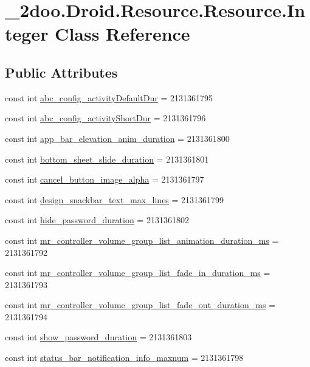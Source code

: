 \hypertarget{class__2doo_1_1_droid_1_1_resource_1_1_integer}{
\section{\_\-2doo.Droid.Resource.Resource.Integer Class Reference}
\label{class__2doo_1_1_droid_1_1_resource_1_1_integer}
}
\subsection*{Public Attributes}
\begin{CompactItemize}
\item 
const int \hyperlink{class__2doo_1_1_droid_1_1_resource_1_1_integer_058b4b1e30bfc11be0626549cce96bee}{abc\_\-config\_\-activityDefaultDur} = 2131361795
\item 
const int \hyperlink{class__2doo_1_1_droid_1_1_resource_1_1_integer_482e0f2d8ca0e8b5a579e2beb8ee8782}{abc\_\-config\_\-activityShortDur} = 2131361796
\item 
const int \hyperlink{class__2doo_1_1_droid_1_1_resource_1_1_integer_e4d7528bd04adaa7c39b17f892f35fa4}{app\_\-bar\_\-elevation\_\-anim\_\-duration} = 2131361800
\item 
const int \hyperlink{class__2doo_1_1_droid_1_1_resource_1_1_integer_c4a8e0290d8c323f0951fd42ed67e0a4}{bottom\_\-sheet\_\-slide\_\-duration} = 2131361801
\item 
const int \hyperlink{class__2doo_1_1_droid_1_1_resource_1_1_integer_f4ba93a47de37a53be9094d49fa533d1}{cancel\_\-button\_\-image\_\-alpha} = 2131361797
\item 
const int \hyperlink{class__2doo_1_1_droid_1_1_resource_1_1_integer_fdd77b059099eed32263297bf889e184}{design\_\-snackbar\_\-text\_\-max\_\-lines} = 2131361799
\item 
const int \hyperlink{class__2doo_1_1_droid_1_1_resource_1_1_integer_b3ae988afcb5f5b40a1eec7fe4a69277}{hide\_\-password\_\-duration} = 2131361802
\item 
const int \hyperlink{class__2doo_1_1_droid_1_1_resource_1_1_integer_daf9d9d029ac294ec521c57993926055}{mr\_\-controller\_\-volume\_\-group\_\-list\_\-animation\_\-duration\_\-ms} = 2131361792
\item 
const int \hyperlink{class__2doo_1_1_droid_1_1_resource_1_1_integer_6a2571547298ddc35573ae5a6cdd2167}{mr\_\-controller\_\-volume\_\-group\_\-list\_\-fade\_\-in\_\-duration\_\-ms} = 2131361793
\item 
const int \hyperlink{class__2doo_1_1_droid_1_1_resource_1_1_integer_2405f58d99e4be981aee758feb74df57}{mr\_\-controller\_\-volume\_\-group\_\-list\_\-fade\_\-out\_\-duration\_\-ms} = 2131361794
\item 
const int \hyperlink{class__2doo_1_1_droid_1_1_resource_1_1_integer_c3ec04547cec238c285078056d790634}{show\_\-password\_\-duration} = 2131361803
\item 
const int \hyperlink{class__2doo_1_1_droid_1_1_resource_1_1_integer_3abfb0d8c548fa3801b3209f19cc183f}{status\_\-bar\_\-notification\_\-info\_\-maxnum} = 2131361798
\end{CompactItemize}
